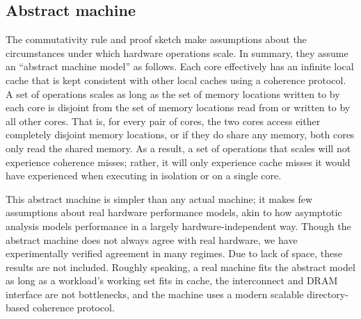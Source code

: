 \subsection{Abstract machine}
\label{sec:abscal}

The commutativity rule and proof sketch make assumptions about the
circumstances under which hardware operations scale. In summary, they
assume an ``abstract machine model'' as follows. Each core effectively
has an infinite local cache that is kept consistent with other local
caches using a coherence protocol. A set of operations scales as long
as the set of memory locations written to by each core is disjoint
from the set of memory locations read from or written to by all other
cores. That is, for every pair of cores, the two cores access either
completely disjoint memory locations, or if they do share any memory,
both cores only read the shared memory. As a result, a set of
operations that scales will not experience coherence misses; rather,
it will only experience cache misses it would have experienced when
executing in isolation or on a single core.

This abstract machine is simpler than any actual machine; it makes few
assumptions about real hardware performance models, akin to how
asymptotic analysis models performance in a largely
hardware-independent way. Though the abstract machine does not always
agree with real hardware, we have experimentally verified agreement in many
regimes. Due to lack of space, these results are not included.
Roughly speaking, a real machine fits the abstract model as long as a
workload's working set fits in cache, the interconnect and DRAM
interface are not bottlenecks, and the machine uses a modern
scalable directory-based coherence protocol.

